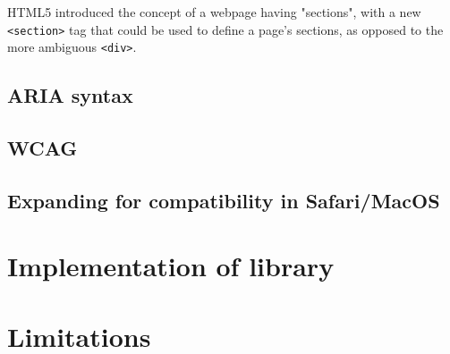 \documentclass[ %
                    author={Aleena Baig},
                supervisor={Dr Simon Lock},
                    degree={BSc},
                     title={On Making Web Accessible Graphs},
                  subtitle={},
                      year={2019} ]{dissertation}
\begin{document}
HTML5 introduced the concept of a webpage having "sections", with a new \texttt{<section>} tag that could be used to define a page's sections, as opposed to the more ambiguous \texttt{<div>}. 




\subsection{ARIA syntax}




\subsection{WCAG}


\subsection{Expanding for compatibility in Safari/MacOS}



\section{Implementation of library}


\section{Limitations}
\end{document}
